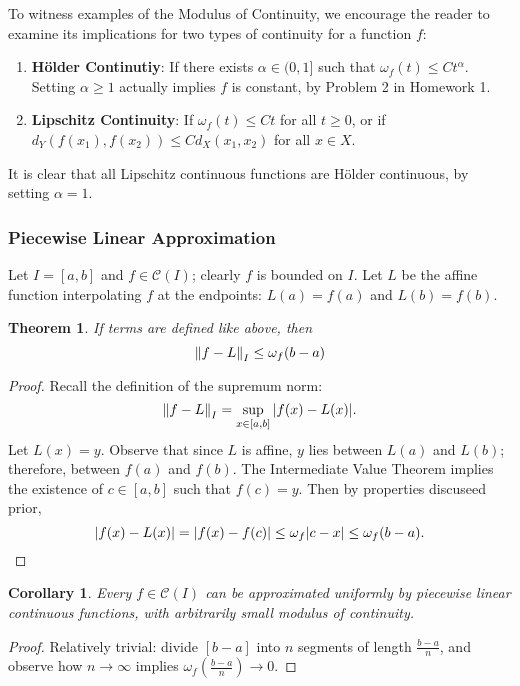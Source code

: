 \documentclass[11pt]{article}
\newtheorem{theorem}{Theorem}
\newtheorem{corollary}{Corollary}
\begin{document}
To witness examples of the Modulus of Continuity, we encourage the reader to examine its implications for two types of continuity for a function $f$:

\begin{enumerate}
  \item \textbf{Hölder Continutiy}: If there exists $\alpha \in (0, 1]$ such that $\omega_{f}(t) \le C t^{\alpha}$. Setting $\alpha \ge 1$ actually implies $f$ is constant, by Problem 2 in Homework 1.
\item \textbf{Lipschitz Continuity}: If $\omega_{f}(t) \le Ct$ for all $t \ge 0$, or if $d_{Y}(f(x_{1}), f(x_{2})) \le C d_{X}(x_{1}, x_{2})$ for all $x \in X$.
\end{enumerate} 

It is clear that all Lipschitz continuous functions are Hölder continuous, by setting $\alpha = 1$.


\newpage


\subsubsection*{Piecewise Linear Approximation}

Let $I = [a, b]$ and $f \in \mathcal{C}(I)$; clearly $f$ is bounded on $I$. Let $L$ be the affine function interpolating $f$ at the endpoints: $L(a) = f(a)$ and $L(b) = f(b)$.

\begin{theorem}
	If terms are defined like above, then
	\[
		\norm{f - L}_{I} \le \omega_{f} (b - a)
	\]
\end{theorem}
\begin{adjustwidth}{0.5cm}{}
	\begin{proof}
		Recall the definition of the supremum norm:
		\[
			\norm{f - L}_{I} = \sup\limits_{x \in [a, b]} \abs{f(x) - L(x)}.
		\]
		Let $L(x) = y$. Observe that since $L$ is affine, $y$ lies between $L(a)$ and $L(b)$; therefore, between $f(a)$ and $f(b)$. The Intermediate Value Theorem implies the existence of $c \in [a, b]$ such that $f(c) = y$. Then by properties discuseed prior,
		\[
			\abs{f(x) - L(x)} = \abs{f(x) - f(c)} \le \omega_{f} \abs{c - x} \le \omega_{f}(b - a).
		\]
	\end{proof}
\end{adjustwidth}
\begin{corollary}
	Every $f \in \mathcal{C}(I)$ can be approximated uniformly by piecewise linear continuous functions, with arbitrarily small modulus of continuity.
\end{corollary}
\begin{adjustwidth}{0.5cm}{}
  \begin{proof}
    Relatively trivial: divide $[b - a]$ into $n$ segments of length $\tfrac{b - a}{n}$, and observe how $n \to \infty$ implies $\omega_{f} \left( \tfrac{b - a}{n} \right) \to 0$.
  \end{proof}
\end{adjustwidth}
\end{document}
